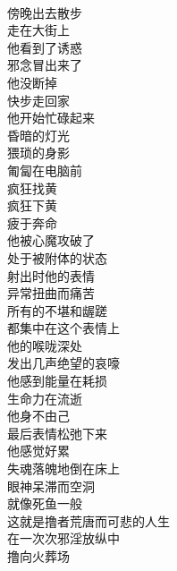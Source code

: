 \begin{poem}[那个忙碌的猥琐身影]
    \begin{multicols}{4}
        \begin{center}~\\
            傍晚出去散步 \\ 走在大街上 \\ 他看到了诱惑 \\ 邪念冒出来了 \\ 他没断掉 \\ 快步走回家 \\ 他开始忙碌起来 \\ 昏暗的灯光 \\ 猥琐的身影 \\ 匍匐在电脑前 \\ 疯狂找黄 \\ 疯狂下黄 \\ 疲于奔命 \\ 他被心魔攻破了 \\ 处于被附体的状态 \\ 射出时他的表情 \\ 异常扭曲而痛苦 \\ 所有的不堪和龌蹉 \\ 都集中在这个表情上 \\ 他的喉咙深处 \\ 发出几声绝望的哀嚎 \\ 他感到能量在耗损 \\ 生命力在流逝 \\ 他身不由己 \\ 最后表情松弛下来 \\ 他感觉好累 \\ 失魂落魄地倒在床上 \\ 眼神呆滞而空洞 \\ 就像死鱼一般 \\ 这就是撸者荒唐而可悲的人生 \\ 在一次次邪淫放纵中 \\ 撸向火葬场
        \end{center}
    \end{multicols}
\end{poem}

